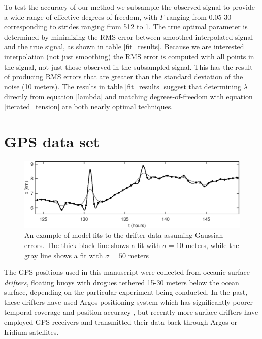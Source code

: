 \documentclass[10pt,journal]{IEEEtran}
\begin{document}
To test the accuracy of our method we subsample the observed signal to provide a wide range of effective degrees of freedom, with $\Gamma$ ranging from $0.05$-$30$ corresponding to strides ranging from 512 to 1. The true optimal parameter is determined by minimizing the RMS error between smoothed-interpolated signal and the true signal, as shown in table \ref{fit_results}. Because we are interested interpolation (not just smoothing) the RMS error is computed with all points in the signal, not just those observed in the subsampled signal. This has the result of producing RMS errors that are greater than the standard deviation of the noise (10 meters). The results in table \ref{fit_results} suggest that determining $\lambda$ directly from equation \ref{lambda} and matching degrees-of-freedom with equation \ref{iterated_tension} are both nearly optimal techniques.



\section{GPS data set}
\label{sec:drifter_data_set}

\begin{figure}[t]
  \centerline{\includegraphics[width=39pc,angle=0]{figures/gaussianfit}}
  
  \caption{An example of model fits to the drifter data assuming Gaussian errors. The thick black line shows a fit with $\sigma=10$ meters, while the gray line shows a fit with $\sigma=50$ meters}
  \label{gaussianfit}
\end{figure}

The GPS positions used in this manuscript were collected from oceanic surface \emph{drifters}, floating buoys with drogues tethered 15-30 meters below the ocean surface, depending on the particular experiment being conducted. In the past, these drifters have used Argos positioning system which has significantly poorer temporal coverage and position accuracy \cite{elipot2016-jgr}, but recently more surface drifters have employed GPS receivers and transmitted their data back through Argos or Iridium satellites.
\end{document}
